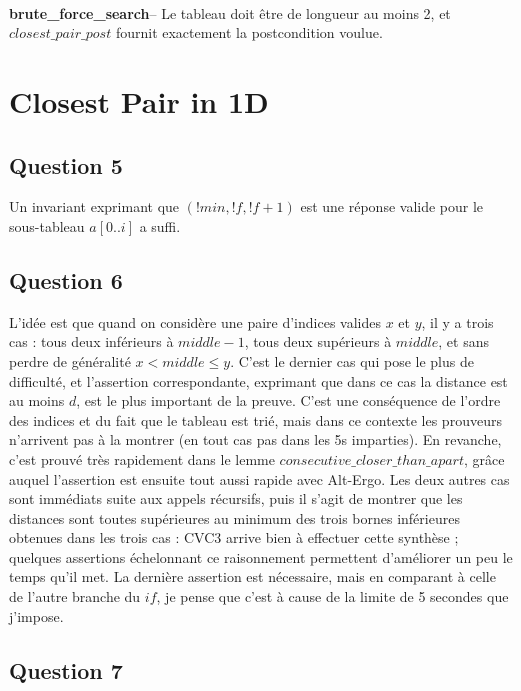 \documentclass[11pt, openany, titlepage]{article}
\newcommand{\paragraphtitle}[1]{\textbf{#1}\;\;--\;}
\begin{document}
\

\paragraphtitle{brute\_force\_search}
Le tableau doit être de longueur au moins 2, et $closest\_pair\_post$ fournit exactement la postcondition voulue.



\section{Closest Pair in 1D}

\subsection{Question 5}

Un invariant exprimant que $(!min,!f,!f+1)$ est une réponse valide pour le sous-tableau ${a[0..i]}$ a suffi.

\subsection{Question 6}

L'idée est que quand on considère une paire d'indices valides $x$ et $y$, il y a trois cas : tous deux inférieurs à $middle-1$, tous deux supérieurs à $middle$, et sans perdre de généralité $x<middle\leq y$. C'est le dernier cas qui pose le plus de difficulté, et l'assertion correspondante, exprimant que dans ce cas la distance est au moins $d$, est le plus important de la preuve. C'est une conséquence de l'ordre des indices et du fait que le tableau est trié, mais dans ce contexte les prouveurs n'arrivent pas à la montrer (en tout cas pas dans les 5s imparties). En revanche, c'est prouvé très rapidement dans le lemme $consecutive\_closer\_than\_apart$, grâce auquel l'assertion est ensuite tout aussi rapide avec Alt-Ergo. Les deux autres cas sont immédiats suite aux appels récursifs, puis il s'agit de montrer que les distances sont toutes supérieures au minimum des trois bornes inférieures obtenues dans les trois cas : CVC3 arrive bien à effectuer cette synthèse ; quelques assertions échelonnant ce raisonnement permettent d'améliorer un peu le temps qu'il met. La dernière assertion est nécessaire, mais en comparant à celle de l'autre branche du $if$, je pense que c'est à cause de la limite de 5 secondes que j'impose.


\subsection{Question 7}
\end{document}
